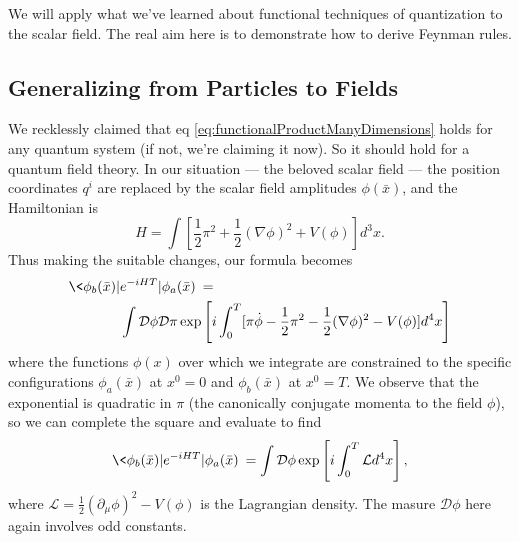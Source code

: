 
We will apply what we've learned about functional techniques of
quantization to the scalar field. The real aim here is to
demonstrate how to derive Feynman rules.

\subsection{Generalizing from Particles to Fields}

We recklessly claimed that eq
\eqref{eq:functionalProductManyDimensions} holds for any quantum
system (if not, we're claiming it now). So it should hold for a
quantum field theory. In our situation --- the beloved 
scalar field --- the position coordinates $q^i$ are replaced by
the scalar field amplitudes $\phi(\bar{x})$, and the Hamiltonian
is
\begin{equation}%
H = \int[\frac{1}{2}\pi^{2}+\frac{1}{2}(\nabla\phi)^2+V(\phi)]d^{3}x.
\end{equation}
Thus making the suitable changes, our formula becomes
\begin{equation}%
\begin{split}
\<\phi_{b}(\bar{x})|&e^{-iHT}|\phi_{a}(\bar{x})\> = \\&\int\mathcal{D}\phi\mathcal{D}\pi\exp\left[i\int^{T}_{0}[\pi\dot{\phi}-\frac{1}{2}\pi^{2}-\frac{1}{2}(\nabla\phi)^{2}-V(\phi)]d^{4}x\right]
\end{split}
\end{equation}
where the functions $\phi(x)$ over which we integrate are
constrained to the specific configurations $\phi_a(\bar{x})$ at
$x^0=0$ and $\phi_b(\bar{x})$ at $x^0=T$. We observe that the
exponential is quadratic in $\pi$ (the canonically conjugate
momenta to the field $\phi$), so we can complete the square and
evaluate to find
\begin{equation}\label{eq:pathIntegralForScalarFieldInGeneral}
\<\phi_b(\bar{x})|e^{-iHT}|\phi_{a}(\bar{x})\> = \int\mathcal{D}\phi\exp\left[i\int^{T}_{0}\mathcal{L}d^{4}x\right],
\end{equation}
where $\mathcal{L} = \frac{1}{2}(\partial_{\mu}\phi)^{2}-V(\phi)$
is the Lagrangian density. The masure $\mathcal{D}\phi$ here
again involves odd constants.


